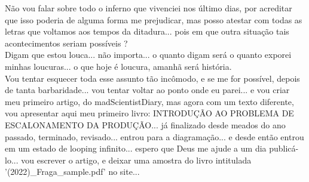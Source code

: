 \documentclass{book}
\begin{document}
Não vou falar sobre todo o inferno que vivenciei nos último dias, por acreditar que isso poderia de alguma forma me prejudicar, mas posso atestar com todas as letras que voltamos aos tempos da ditadura... pois em que outra situação tais acontecimentos seriam possíveis ? \\

Digam que estou louca... não importa... o quanto digam será o quanto exporei minhas loucuras... o que hoje é loucura, amanhã será história. \\

Vou tentar esquecer toda esse assunto tão incômodo, e se me for possível, depois de tanta barbaridade... vou tentar voltar ao ponto onde eu parei... e vou criar meu primeiro artigo, do madScientistDiary, mas agora com um texto diferente, vou apresentar aqui meu primeiro livro: INTRODUÇÃO AO PROBLEMA DE ESCALONAMENTO DA PRODUÇÃO... já finalizado desde meados do ano passado, terminado, revisado... entrou para a diagramação... e desde então entrou em um estado de looping infinito... espero que Deus me ajude a um dia publicá-lo... vou escrever o artigo, e deixar uma amostra do livro intitulada '(2022)\_Fraga\_sample.pdf' no site... \\
\end{document}
